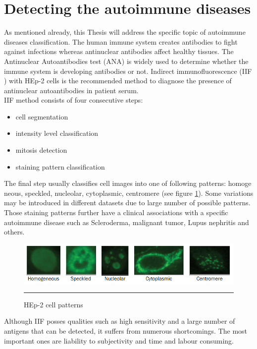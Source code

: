 \section{Detecting the autoimmune diseases}

As mentioned already, this Thesis will address the specific topic of autoimmune diseases classification. The human immune system creates antibodies to fight against infections whereas antinuclear antibodies affect healthy tissues. The Antinuclear Autoantibodies test (ANA) is widely used to determine whether the immune system is developing antibodies or not. Indirect immunofluorescence (IIF ) with HEp-2 cells is the recommended method to diagnose the presence of antinuclear autoantibodies in patient serum. \\

IIF method consists of four consecutive steps:
\begin{itemize}
	\item cell segmentation
 	\item intensity level classification
 	\item mitosis detection
 	\item staining pattern classification
\end{itemize}

The final step usually classifies cell images into one of following patterns: homoge
neous, speckled, nucleolar, cytoplasmic, centromere (see figure \ref{fig:CellExamples}). Some variations may be introduced in different datasets due to large number of possible patterns. Those staining patterns further have a clinical associations with a specific autoimmune disease such as Scleroderma, malignant tumor, Lupus nephritis and others. \\

\begin{figure}[htbp]
	\centering
	\includegraphics[scale=0.7]{Figures/introduction/cell_examples}
	\rule{35em}{0.5pt}
	\caption[Cell examples]{HEp-2 cell patterns}
	\label{fig:CellExamples}

\end{figure}

Although IIF posses qualities such as high sensitivity and a large number of antigens
that can be detected, it suffers from numerous shortcomings. The most important ones
are liability to subjectivity and time and labour consuming. \\

